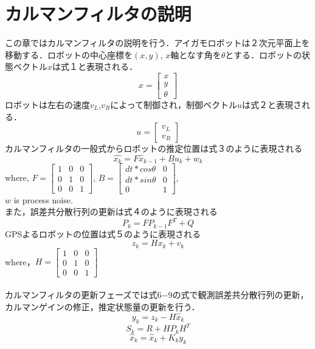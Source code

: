 \documentclass[a4paper]{article}
\begin{document}
\section{カルマンフィルタの説明}
この章ではカルマンフィルタの説明を行う．アイガモロボットは２次元平面上を移動する．ロボットの中心座標を$(x,y)$, $x$軸となす角を$\theta$とする．ロボットの状態ベクトル$x$は式１と表現される．
\begin{equation}
    x = \begin{bmatrix}
        x \\
        y \\
        \theta
        \end{bmatrix} 
\end{equation}
ロボットは左右の速度$v_{L}$,$v_{R}$によって制御され，制御ベクトル$u$は式２と表現される．
\begin{equation}
    u = \begin{bmatrix}
        v_{L} \\
        v_{R} 
        \end{bmatrix} 
\end{equation}
%
%
カルマンフィルタの一般式からロボットの推定位置は式３のように表現される
\begin{equation}
    \hat{x_{k}} =F\hat{x}_{k-1} + Bu_{k} + w_{k}
\end{equation}
where, $F = \begin{bmatrix} 1 & 0 & 0 \\  0 & 1 & 0 \\  0 & 0 & 1 \end{bmatrix}$,
$B = \begin{bmatrix} dt * cos\theta & 0 \\  dt * sin\theta & 0 \\ 0 & 1 \end{bmatrix}$,\\
$w$ is process noise.\\
%
%
また，誤差共分散行列の更新は式４のように表現される
\begin{equation}
    P_{k} = F P_{k-1} F^{T} + Q
    \label{eq:4}
\end{equation}
%
%
GPSよるロボットの位置は式５のように表現される
\begin{equation}
    z_{k} = Hx_{k} + v_{k}
    \label{eq:5}
\end{equation}
where，$H = \begin{bmatrix} 1 & 0 & 0 \\  0 & 1 & 0 \\  0 & 0 & 1 \end{bmatrix}$\\ \\
カルマンフィルタの更新フェーズでは式6−9の式で観測誤差共分散行列の更新，カルマンゲインの修正，推定状態量の更新を行う．
\begin{equation}
    y_{k} = z_{k} - H\hat{x}_{k}
    \label{eq:6}
\end{equation}
%
%
\begin{equation}
    S_{k} = R + HP_{k}H^{T}
    \label{eq:7}
\end{equation}
%
%
\begin{equation}
    \hat{x}_{k} = \hat{x}_{k}+K_{k}y_{k}
    \label{eq:8}
\end{equation}
\end{document}
